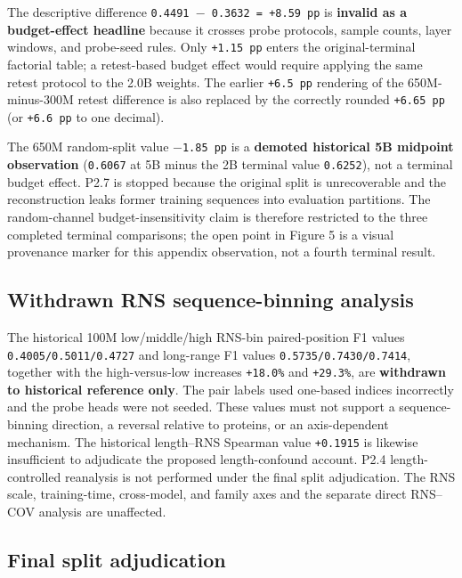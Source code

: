 The descriptive difference \texttt{0.4491\ \(-\)\ 0.3632\ =\ +8.59\ pp} is \textbf{invalid as a budget-effect headline} because it crosses probe protocols, sample counts, layer windows, and probe-seed rules. Only \texttt{+1.15\ pp} enters the original-terminal factorial table; a retest-based budget effect would require applying the same retest protocol to the 2.0B weights. The earlier \texttt{+6.5\ pp} rendering of the 650M-minus-300M retest difference is also replaced by the correctly rounded \texttt{+6.65\ pp} (or \texttt{+6.6\ pp} to one decimal).

The 650M random-split value \texttt{\(-\)1.85\ pp} is a \textbf{demoted historical 5B midpoint observation} (\texttt{0.6067} at 5B minus the 2B terminal value \texttt{0.6252}), not a terminal budget effect. P2.7 is stopped because the original split is unrecoverable and the reconstruction leaks former training sequences into evaluation partitions. The random-channel budget-insensitivity claim is therefore restricted to the three completed terminal comparisons; the open point in Figure 5 is a visual provenance marker for this appendix observation, not a fourth terminal result.

\hypertarget{a.5-withdrawn-rns-sequence-binning-analysis}{%
\subsection{Withdrawn RNS sequence-binning analysis}\label{a.5-withdrawn-rns-sequence-binning-analysis}}

The historical 100M low/middle/high RNS-bin paired-position F1 values \texttt{0.4005/0.5011/0.4727} and long-range F1 values \texttt{0.5735/0.7430/0.7414}, together with the high-versus-low increases \texttt{+18.0\%} and \texttt{+29.3\%}, are \textbf{withdrawn to historical reference only}. The pair labels used one-based indices incorrectly and the probe heads were not seeded. These values must not support a sequence-binning direction, a reversal relative to proteins, or an axis-dependent mechanism. The historical length--RNS Spearman value \texttt{+0.1915} is likewise insufficient to adjudicate the proposed length-confound account. P2.4 length-controlled reanalysis is not performed under the final split adjudication. The RNS scale, training-time, cross-model, and family axes and the separate direct RNS--COV analysis are unaffected.

\hypertarget{a.6-final-split-adjudication}{%
\subsection{Final split adjudication}\label{a.6-final-split-adjudication}}


